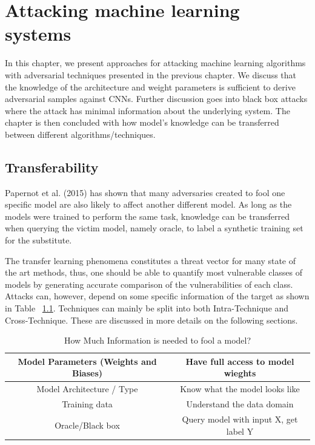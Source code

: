 \chapter{Attacking machine learning systems}

In this chapter, we present approaches for attacking machine learning algorithms with adversarial techniques presented in the previous chapter. We discuss that the knowledge of the architecture and weight parameters is sufficient to derive adversarial samples against CNNs. Further discussion goes into black box attacks where the attack has minimal information about the underlying system. The chapter is then concluded with how model's knowledge can be transferred between different algorithms/techniques.


\section{Transferability}

Papernot et al. (2015) has shown that many adversaries created to fool one specific model are also likely to affect another different model. As long as the models were trained to perform the same task, knowledge can be transferred when querying the victim model, namely oracle, to label a synthetic training set for the substitute.

The transfer learning phenomena constitutes a threat vector for many state of the art methods, thus, one should be able to quantify most vulnerable classes of models by generating accurate comparison of the vulnerabilities of each class. Attacks can, however, depend on some specific information of the target as shown in Table ~\ref{tbl:attack_info}. Techniques can mainly be split into both Intra-Technique and Cross-Technique. These are discussed in more details on the following sections.

\vskip 1cm

\begin {table}
\begin{tabular}{|c|c|}
	\hline 
	Model Parameters (Weights and Biases) & Have full access to model wieghts \\ 
	\hline 
	Model Architecture / Type & Know what the model looks like \\ 
	\hline 
	Training data & Understand the data domain \\ 
	\hline 
	Oracle/Black box & Query model with input X, get label Y \\ 
	\hline 
	
\end{tabular} 
\caption {How Much Information is needed to fool a model?}
\label{tbl:attack_info}
\end {table}

